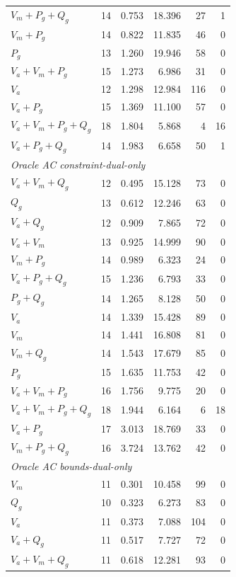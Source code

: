 \begin{table}[!t]
\begin{tabular}{lrrrrr}
$V_m{+}P_g{+}Q_g$ & 14 & 0.753 & 18.396 & 27 & 1 \\
$V_m{+}P_g$ & 14 & 0.822 & 11.835 & 46 & 0 \\
$P_g$ & 13 & 1.260 & 19.946 & 58 & 0 \\
$V_a{+}V_m{+}P_g$ & 15 & 1.273 & 6.986 & 31 & 0 \\
$V_a$ & 12 & 1.298 & 12.984 & 116 & 0 \\
$V_a{+}P_g$ & 15 & 1.369 & 11.100 & 57 & 0 \\
$V_a{+}V_m{+}P_g{+}Q_g$ & 18 & 1.804 & 5.868 & 4 & 16 \\
$V_a{+}P_g{+}Q_g$ & 14 & 1.983 & 6.658 & 50 & 1 \\
\midrule
\multicolumn{6}{l}{\textit{Oracle AC constraint-dual-only}} \\
$V_a{+}V_m{+}Q_g$ & 12 & 0.495 & 15.128 & 73 & 0 \\
$Q_g$ & 13 & 0.612 & 12.246 & 63 & 0 \\
$V_a{+}Q_g$ & 12 & 0.909 & 7.865 & 72 & 0 \\
$V_a{+}V_m$ & 13 & 0.925 & 14.999 & 90 & 0 \\
$V_m{+}P_g$ & 14 & 0.989 & 6.323 & 24 & 0 \\
$V_a{+}P_g{+}Q_g$ & 15 & 1.236 & 6.793 & 33 & 0 \\
$P_g{+}Q_g$ & 14 & 1.265 & 8.128 & 50 & 0 \\
$V_a$ & 14 & 1.339 & 15.428 & 89 & 0 \\
$V_m$ & 14 & 1.441 & 16.808 & 81 & 0 \\
$V_m{+}Q_g$ & 14 & 1.543 & 17.679 & 85 & 0 \\
$P_g$ & 15 & 1.635 & 11.753 & 42 & 0 \\
$V_a{+}V_m{+}P_g$ & 16 & 1.756 & 9.775 & 20 & 0 \\
$V_a{+}V_m{+}P_g{+}Q_g$ & 18 & 1.944 & 6.164 & 6 & 18 \\
$V_a{+}P_g$ & 17 & 3.013 & 18.769 & 33 & 0 \\
$V_m{+}P_g{+}Q_g$ & 16 & 3.724 & 13.762 & 42 & 0 \\
\midrule
\multicolumn{6}{l}{\textit{Oracle AC bounds-dual-only}} \\
$V_m$ & 11 & 0.301 & 10.458 & 99 & 0 \\
$Q_g$ & 10 & 0.323 & 6.273 & 83 & 0 \\
$V_a$ & 11 & 0.373 & 7.088 & 104 & 0 \\
$V_a{+}Q_g$ & 11 & 0.517 & 7.727 & 72 & 0 \\
$V_a{+}V_m{+}Q_g$ & 11 & 0.618 & 12.281 & 93 & 0 \\

\end{tabular}
\end{table}
